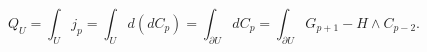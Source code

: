 \begin{equation}
Q_U=\int_Uj_p=\int_Ud(dC_p)=\int_{\partial U}dC_p=\int_{\partial U}G_{p+1}-H\wedge C_{p-2}.
\end{equation}

